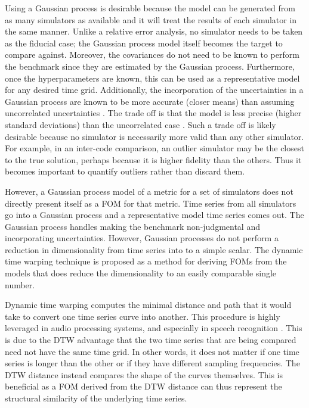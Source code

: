 Using a Gaussian process is desirable because the model can be generated
from as many simulators as available and it will treat the results of
each simulator in the same manner. Unlike a relative error analysis, no 
simulator needs to be taken as the fiducial case; the Gaussian process model 
itself becomes the target to compare against. 
Moreover, the covariances do not need to be known to perform the benchmark
since they are estimated by the Gaussian process. Furthermore, once the 
hyperparameters are known, this can be used as a representative model for 
any desired time grid. Additionally, the incorporation of the uncertainties
in a Gaussian process are known to be more accurate (closer means) than 
assuming uncorrelated uncertainties \cite{rasmussen1996evaluation,ko2009gp}.
The trade off is that the model is less precise (higher standard deviations) 
than the uncorrelated case \cite{hodlr}. Such a trade off is likely 
desirable because no simulator 
is necessarily more valid than any other simulator. For example, 
in an inter-code comparison, an outlier simulator may be the 
closest to the true solution, perhaps because it is higher fidelity than 
the others. Thus it becomes important to quantify outliers rather than 
discard them.

However, a Gaussian process model of a metric for a set of simulators 
does not directly present itself as a FOM for that metric. Time series from 
all simulators go into a Gaussian process and a representative model time 
series comes out. The Gaussian process handles making the benchmark
non-judgmental and incorporating uncertainties. However, Gaussian processes 
do not 
perform a reduction in dimensionality from time series into to a simple 
scalar. The dynamic time warping 
technique is proposed as a method for deriving FOMs from the models that 
does reduce the dimensionality to an easily comparable single number.

Dynamic time warping computes the minimal distance and path that it would 
take to convert one time series curve into another. This procedure is highly 
leveraged in audio processing systems, and especially in speech recognition
\cite{myers1980performance,muda2010voice}.
This is due to the DTW advantage that the two time series that are being 
compared need not have the same time grid. In other words, it does not matter 
if one time series is longer than 
the other or if they have different sampling frequencies. The DTW distance
instead compares the shape of the curves themselves. This is beneficial as
a FOM derived from the DTW distance can thus represent the structural 
similarity of the underlying time series.
 

